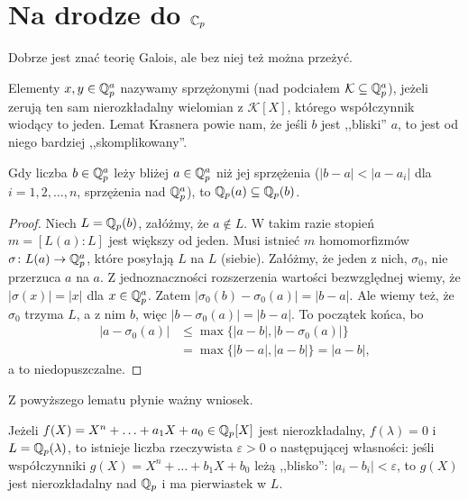 \section{Na drodze do $\mathbb C_p$}
Dobrze jest znać teorię Galois, ale bez niej też można przeżyć.

Elementy $x, y \in \mathbb Q_p^a$ nazywamy {sprzężonymi} (nad podciałem $\mathcal K \subseteq \mathbb Q_p^a$), jeżeli zerują ten sam nierozkładalny wielomian z $\mathcal K[X]$, którego współczynnik wiodący to jeden.
Lemat Krasnera powie nam, że jeśli $b$ jest ,,bliski'' $a$, to jest od niego bardziej ,,skomplikowany''.

\begin{twierdzenie}
	Gdy liczba $b \in \mathbb Q_p^a$ leży bliżej $a  \in \mathbb Q_p^a$ niż jej sprzężenia ($|b-a| < |a - a_i|$ dla $i = 1, 2, \dots, n$, sprzężenia nad $\mathbb Q_p^a$), to $\mathbb Q_p(a) \subseteq \mathbb Q_p(b)$.
\end{twierdzenie}

\begin{proof}
	Niech $L = \mathbb Q_p(b)$, załóżmy, że $a \not \in L$.
	W takim razie stopień $m = [L(a) : L]$ jest większy od jeden.
	Musi istnieć $m$ homomorfizmów $\sigma \colon L(a) \to \mathbb Q_p^a$, które posyłają $L$ na $L$ (siebie).
	Załóżmy, że jeden z nich, $\sigma_0$, nie przerzuca $a$ na $a$.
	Z jednoznaczności rozszerzenia wartości bezwzględnej wiemy, że $|\sigma(x)| = |x|$ dla $x \in \mathbb Q_p^a$.
	Zatem $|\sigma_0(b) - \sigma_0(a) | = |b-a|$. Ale wiemy też, że $\sigma_0$ trzyma $L$, a z nim $b$, więc $|b - \sigma_0(a)| = |b-a|$.
	To początek końca, bo
	\begin{align*}
		|a - \sigma_0(a)| & \le \max \{|a-b|, |b-\sigma_0(a)|\}\\
		& = \max \{|b-a|, |a-b|\}= |a-b|,
	\end{align*}
	a to niedopuszczalne.
\end{proof}

Z powyższego lematu płynie ważny wniosek.

\begin{fakt}\label{satis}
	Jeżeli $f(X) = X^n + \ldots + a_1 X + a_0 \in \mathbb Q_p[X]$ jest nierozkładalny, $f(\lambda) = 0$ i $L = \mathbb Q_p(\lambda)$, to istnieje liczba rzeczywista $\varepsilon > 0$ o następującej własności: jeśli współczynniki $g(X) = X^n + \ldots + b_1X + b_0$ leżą ,,blisko'': $|a_i - b_i| < \varepsilon$, to $g(X)$ jest nierozkładalny nad $\mathbb Q_p$ i ma pierwiastek w $L$.
\end{fakt}

